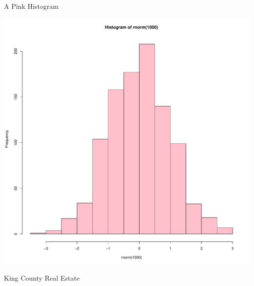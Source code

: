 \documentclass[final]{beamer}\usepackage[]{graphicx}\usepackage[]{color}
\makeatletter
\def\maxwidth{ %
  \ifdim\Gin@nat@width>\linewidth
    \linewidth
  \else
    \Gin@nat@width
  \fi
}
\newenvironment{knitrout}{}{} %
\makeatother
\begin{document}
\begin{frame}[fragile]
\begin{columns}[t]
\begin{column}{0.23\linewidth}
\begin{minipage}[t][.955\textheight]{\linewidth}
\begin{block}{A Pink Histogram}
\begin{knitrout}
{\centering \includegraphics[width=\maxwidth]{figure/HIST-1} 

}



\end{knitrout}
\vspace{0ex}
\end{block}
\vfill

\vspace{0ex}
\begin{block}{King County Real Estate}
\vspace{0ex}
\begin{knitrout}
\color{fgcolor}


\end{knitrout}
\end{block}
\end{minipage}
\end{column}
\end{columns}
\end{frame}
\end{document}

